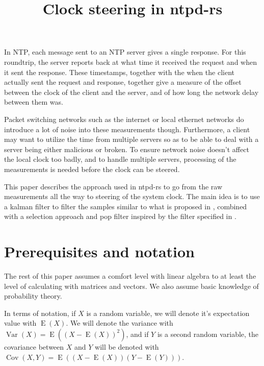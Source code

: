 \documentclass{article}
\title{Clock steering in ntpd-rs}
\DeclareMathOperator{\Var}{Var}
\DeclareMathOperator{\Cov}{Cov}
\DeclareMathOperator{\E}{E}
\begin{document}
\maketitle

In NTP, each message sent to an NTP server gives a single response. For this roundtrip, the server reports back at what time it received the request and when it sent the response. These timestamps, together with the when the client actually sent the request and response, together give a measure of the offset between the clock of the client and the server, and of how long the network delay between them was.

Packet switching networks such as the internet or local ethernet networks do introduce a lot of noise into these measurements though. Furthermore, a client may want to utilize the time from multiple servers so as to be able to deal with a server being either malicious or broken. To ensure network noise doesn't affect the local clock too badly, and to handle multiple servers, processing of the measurements is needed before the clock can be steered.

This paper describes the approach used in ntpd-rs to go from the raw measurements all the way to steering of the system clock. The main idea is to use a kalman filter to filter the samples similar to what is proposed in \cite{giada2015}, combined with a selection approach and pop filter inspired by the filter specified in \cite{rfc5905}.

\section{Prerequisites and notation}

The rest of this paper assumes a comfort level with linear algebra to at least the level of calculating with matrices and vectors. We also assume basic knowledge of probability theory.

In terms of notation, if $X$ is a random variable, we will denote it's expectation value with $\E(X)$. We will denote the variance with $\Var(X) = \E((X-\E(X))^2)$, and if $Y$ is a second random variable, the covariance between $X$ and $Y$ will be denoted with $\Cov(X,Y) = \E((X-\E(X))(Y-\E(Y)))$.
\end{document}
